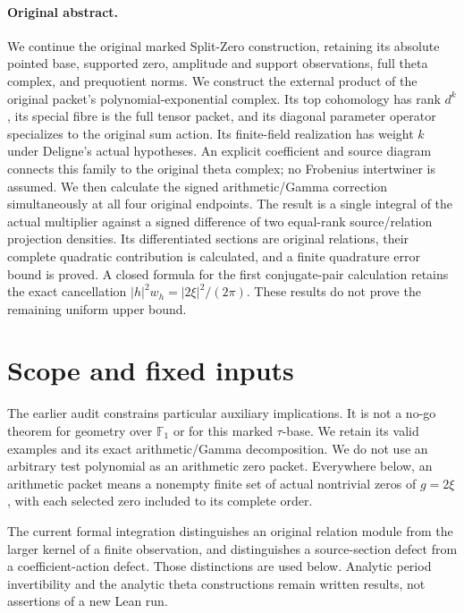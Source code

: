 


\paragraph{Original abstract.}
We continue the original marked Split-Zero construction, retaining its absolute pointed base, supported zero, amplitude and support observations, full theta complex, and prequotient norms. We construct the external product of the original packet's polynomial-exponential complex. Its top cohomology has rank $d^k$, its special fibre is the full tensor packet, and its diagonal parameter operator specializes to the original sum action. Its finite-field realization has weight $k$ under Deligne's actual hypotheses. An explicit coefficient and source diagram connects this family to the original theta complex; no Frobenius intertwiner is assumed. We then calculate the signed arithmetic/Gamma correction simultaneously at all four original endpoints. The result is a single integral of the actual multiplier against a signed difference of two equal-rank source/relation projection densities. Its differentiated sections are original relations, their complete quadratic contribution is calculated, and a finite quadrature error bound is proved. A closed formula for the first conjugate-pair calculation retains the exact cancellation $|h|^2w_h=|2\xi|^2/(2\pi)$. These results do not prove the remaining uniform upper bound.



\section{Scope and fixed inputs}
The earlier audit constrains particular auxiliary implications. It is not a no-go theorem for geometry over $\mathbb F_1$ or for this marked $\tau$-base. We retain its valid examples and its exact arithmetic/Gamma decomposition. We do not use an arbitrary test polynomial as an arithmetic zero packet. Everywhere below, an arithmetic packet means a nonempty finite set of actual nontrivial zeros of $g=2\xi$, with each selected zero included to its complete order.

The current formal integration distinguishes an original relation module from the larger kernel of a finite observation, and distinguishes a source-section defect from a coefficient-action defect. Those distinctions are used below. Analytic period invertibility and the analytic theta constructions remain written results, not assertions of a new Lean run.

